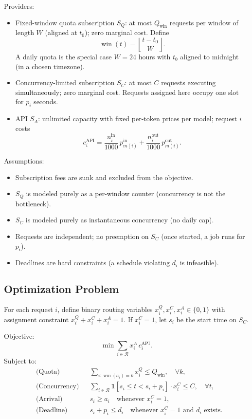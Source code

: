 \documentclass[11pt]{article}
\begin{document}
Providers:
\begin{itemize}
  \item Fixed-window quota subscription \(S_Q\): at most \(Q_{\text{win}}\) requests per window of length \(W\) (aligned at \(t_0\)); zero marginal cost. Define
        \[
          \operatorname{win}(t) = \left\lfloor \frac{t - t_0}{W} \right\rfloor.
        \]
        A daily quota is the special case \(W=24\) hours with \(t_0\) aligned to midnight (in a chosen timezone).
  \item Concurrency-limited subscription \(S_C\): at most \(C\) requests executing simultaneously; zero marginal cost. Requests assigned here occupy one slot for \(p_i\) seconds.
  \item API \(S_A\): unlimited capacity with fixed per-token prices per model; request \(i\) costs
        \[
          c_i^{\text{API}} = \frac{n_i^{\text{in}}}{1000}\,p_{m(i)}^{\text{in}} + \frac{n_i^{\text{out}}}{1000}\,p_{m(i)}^{\text{out}}.
        \]
\end{itemize}

Assumptions:
\begin{itemize}
  \item Subscription fees are sunk and excluded from the objective.
  \item \(S_Q\) is modeled purely as a per-window counter (concurrency is not the bottleneck).
  \item \(S_C\) is modeled purely as instantaneous concurrency (no daily cap).
  \item Requests are independent; no preemption on \(S_C\) (once started, a job runs for \(p_i\)).
  \item Deadlines are hard constraints (a schedule violating \(d_i\) is infeasible).
\end{itemize}

\subsection{Optimization Problem}
For each request \(i\), define binary routing variables \(x_i^Q, x_i^C, x_i^A \in \{0,1\}\) with
assignment constraint \(x_i^Q + x_i^C + x_i^A = 1\). If \(x_i^C=1\), let \(s_i\) be the start
time on \(S_C\).

Objective:
\[
  \min \sum_{i\in\mathcal{R}} x_i^A\,c_i^{\text{API}}.
\]
Subject to:
\begin{align}
  &\text{(Quota)} && \sum_{i: \operatorname{win}(a_i)=k} x_i^Q \le Q_{\text{win}}, \quad \forall k, \\
  &\text{(Concurrency)} && \sum_{i\in\mathcal{R}} \mathbf{1}[s_i \le t < s_i + p_i] \cdot x_i^C \le C, \quad \forall t, \\
  &\text{(Arrival)} && s_i \ge a_i \quad \text{whenever } x_i^C=1, \\
  &\text{(Deadline)} && s_i + p_i \le d_i \quad \text{whenever } x_i^C=1 \text{ and } d_i \text{ exists}.
\end{align}
\end{document}
